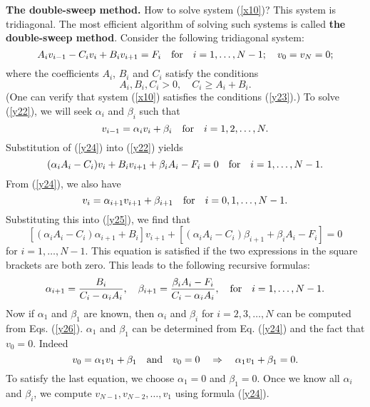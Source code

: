 \textbf{The double-sweep method.} How to solve system (\ref{x10})? This system is tridiagonal. The most efficient algorithm
of solving such systems is called {\bf the double-sweep method}. Consider the following
tridiagonal system:
\begin{equation}
A_{i}v_{i-1}-C_{i}v_{i}+B_{i}v_{i+1}=F_{i} \quad \hbox{for}\quad i=1, \dots, N-1;
\quad v_{0}=v_{N}=0; \label{y22}
\end{equation}
where the coefficients $A_{i}$, $B_{i}$ and $C_{i}$ satisfy the conditions
\begin{equation}
A_{i}, B_{i}, C_{i} > 0, \quad  C_{i} \geq A_{i} + B_{i}.  \label{y23}
\end{equation}
(One can verify that system (\ref{x10}) satisfies the conditions (\ref{y23}).)
To solve (\ref{y22}), we will seek $\alpha_{i}$ and $\beta_{i}$ such that
\begin{equation}
v_{i-1}=\alpha_{i}v_{i}+\beta_{i}  \quad  \hbox{for} \quad
i=1, 2, \dots, N.  \label{y24}
\end{equation}
Substitution of (\ref{y24}) into (\ref{y22}) yields
\begin{equation}
(\alpha_{i}A_{i}-C_{i})v_{i}+B_{i}v_{i+1}+\beta_{i}A_{i}-F_{i}=0 \quad \hbox{for}\quad i=1, \dots, N-1. \label{y25}
\end{equation}
From (\ref{y24}), we also have
\[
v_{i}=\alpha_{i+1}v_{i+1}+\beta_{i+1}  \quad  \hbox{for} \quad
i=0, 1, \dots, N-1.
\]
Substituting this into (\ref{y25}), we find that
\[
[(\alpha_{i}A_{i}-C_{i})\alpha_{i+1}+B_{i}]v_{i+1}+[
(\alpha_{i}A_{i}-C_{i})\beta_{i+1}+\beta_{i}A_{i}-F_{i}]=0
\]
for $i=1, \dots, N-1$.
This equation is satisfied if the two expressions in the square brackets are both zero. 
This leads to the following recursive formulas:
\begin{equation}
\alpha_{i+1}=\frac{B_{i}}{C_{i}-\alpha_{i}A_{i}}, \quad
\beta_{i+1}=\frac{\beta_{i}A_{i}-F_{i}}{C_{i}-\alpha_{i}A_{i}}, \quad
\hbox{for}\quad i=1, \dots, N-1. \label{y26}
\end{equation}
Now if $\alpha_{1}$ and  $\beta_{1}$ are known, then $\alpha_{i}$ and  $\beta_{i}$ for $i=2, 3, \dots, N$
can be computed from Eqs. (\ref{y26}).  $\alpha_{1}$ and  $\beta_{1}$ can be determined from Eq. (\ref{y24}) and
the fact that $v_{0}=0$. Indeed
\[
v_{0}= \alpha_{1}v_{1}+\beta_{1} \quad \hbox{and} \quad v_{0}=0 \quad \Rightarrow \quad
\alpha_{1}v_{1}+\beta_{1}=0.
\]
To satisfy the last equation, we choose $\alpha_{1}=0$ and $\beta_{1}=0$. Once we know all $\alpha_{i}$
and $\beta_{i}$, we compute $v_{N-1}, v_{N-2}, \dots, v_{1}$ using formula (\ref{y24}).

